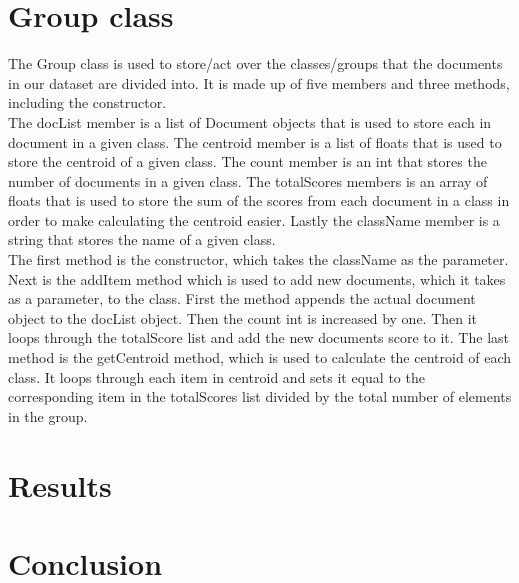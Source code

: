 \documentclass[12pt]{article}
\begin{document}
\section{Group class}
\indent The Group class is used to store/act over the classes/groups that the documents in our dataset are divided into. It is made up of five members and three methods, including the constructor. \\
\indent The docList member is a list of Document objects that is used to store each in document in a given class. The centroid member is a list of floats that is used to store the centroid of a given class. The count member is an int that stores the number of documents in a given class. The totalScores members is an array of floats that is used to store the sum of the scores from each document in a class in order to make calculating the centroid easier. Lastly the className member is a string that stores the name of a given class. \\
\indent The first method is the constructor, which takes the className as the parameter. Next is the addItem method which is used to add new documents, which it takes as a parameter, to the class. First the method appends the actual document object to the docList object. Then the count int is increased by one. Then it loops through the totalScore list and add the new documents score to it. The last method is the getCentroid method, which is used to calculate the centroid of each class. It loops through each item in centroid and sets it equal to the corresponding item in the totalScores list divided by the total number of elements in the group.

\section{Results}

\section{Conclusion}


\begin{thebibliography}{9}


\end{thebibliography}
\end{document}
